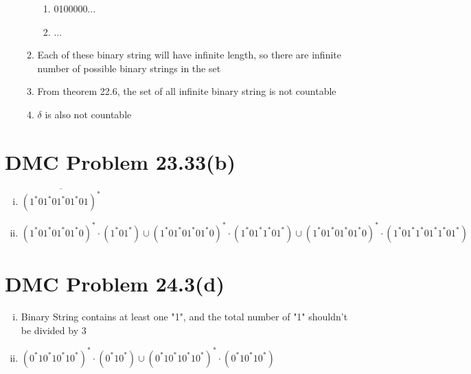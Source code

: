 \documentclass{article}
\def\math#1{$#1$}
\begin{document}
\begin{enumerate}[a)]
\begin{enumerate}
\begin{enumerate}[1)]
                    \item 0100000...
                    \item ...
                \end{enumerate}
            \item Each of these binary string will have infinite length, so there are infinite number of possible binary strings in the set
            \item From theorem 22.6, the set of all infinite binary string is not countable
            \item \math{\delta} is also not countable
        \end{enumerate}
\end{enumerate}

\section{DMC Problem 23.33(b)}
\begin{enumerate}[i)]
    \item \math{\overline{(1^*01^*01^*01^*01)^*}}
    \item \math{
    {(1^*01^*01^*01^*0)^*} \cdot {(1^*01^*)} \cup 
    {(1^*01^*01^*01^*0)^*} \cdot {(1^*01^*1^*01^*)} \cup
    {(1^*01^*01^*01^*0)^*} \cdot {(1^*01^*1^*01^*1^*01^*)}
    }
\end{enumerate}

\section{DMC Problem 24.3(d)}
\begin{enumerate}[i)]
    \item Binary String contains at least one "1", and the total number of "1" shouldn't be divided by 3
    \item \math{(0^*10^*10^*10^*)^* \cdot {(0^*10^*)} \cup 
                (0^*10^*10^*10^*)^* \cdot {(0^*10^*10^*)}}
\end{enumerate}
\end{document}
